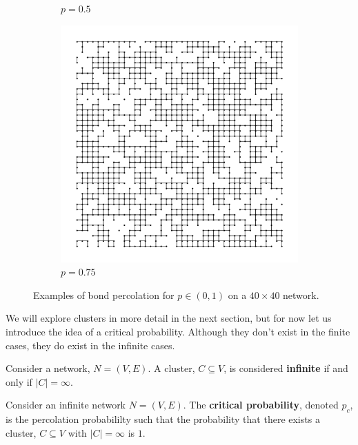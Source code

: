 \begin{figure}[p]
\begin{subfigure}[b]{0.45\textwidth}
    \caption{$p=0.5$}
    \label{fig:p=0.5}
  \end{subfigure}
  \hfill
  \begin{subfigure}[b]{0.45\textwidth}
    \centering
    \includegraphics[width=\textwidth]{1/percolation3}
    \caption{$p=0.75$}
    \label{fig:p=0.75}
  \end{subfigure}
  \caption{Examples of bond percolation for $p\in(0,1)$ on a $40 \times 40$ network.}
  \label{fig:probabilities}
\end{figure}

We will explore clusters in more detail in the next section, but for now let us introduce the idea of a critical probability. Although they don't exist in the finite cases, they do
exist in the infinite cases. 

\begin{definition}\label{def:infinite cluster}
  Consider a network, $N = (V, E)$. A cluster, $C \subseteq V$, is considered \textbf{infinite} if and only if $|C| = \infty$.
\end{definition}

\begin{definition}\label{def:critical probability}
  Consider an infinite network $N = (V, E)$. The \textbf{critical probability}, denoted $p_c$, is the percolation probabililty such that the probability that there exists a
  cluster, $C \subseteq V$ with $|C| = \infty$ is $1$.
\end{definition}

